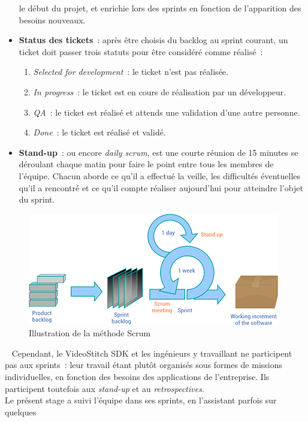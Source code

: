 \begin{itemize}
  le début du projet, et enrichie lors des sprints en fonction de l'apparition des besoins nouveaux.
  \item \textbf{Status des tickets}~: après être choisis du backlog au sprint courant, 
  un ticket doit passer trois statuts pour être considéré comme réalisé~:
    \begin{enumerate}
      \item \textit{Selected for development}~: le ticket n'est pas réalisée.
      \item \textit{In progress}~: le ticket est en cours de réalisation par un développeur.
      \item \textit{QA}~: le ticket est réalisé et attends une validation d'une autre personne.
      \item \textit{Done}~: le ticket est réalisé et validé. 
    \end{enumerate}
  \item \textbf{Stand-up}~: \label{stand-up} ou encore \textit{daily scrum}, est une courte réunion de 15 minutes
  se déroulant chaque matin pour faire le point entre tous les membres de l'équipe.
  Chacun aborde ce qu'il a effectué la veille, les difficultés éventuelles qu'il
  a rencontré et ce qu'il compte réaliser aujourd'hui pour atteindre l'objet du sprint.
\end{itemize}
\begin{figure}
  \centering
  \includegraphics[width=11cm]{images/scrum-process.png}
  \caption{Illustration de la méthode Scrum\cite{scrum-process}}
\end{figure}
\ \newline
Cependant, le VideoStitch SDK et les ingénieurs y travaillant ne participent pas
aux sprints~: leur travail étant plutôt organisés sous formes de missions individuelles,
en fonction des besoins des applications de l'entreprise. Ils participent toutefois 
aux \textit{stand-up} et au \textit{retrospectives}.\\
Le présent stage a suivi l'équipe dans ses sprints, en l'assistant parfois sur quelques
